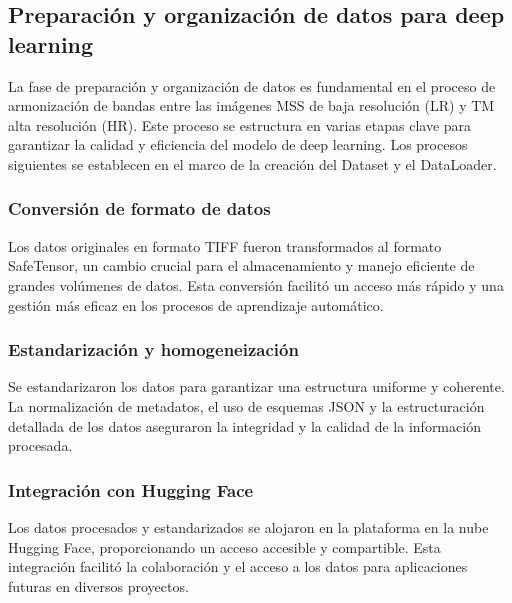

        \subsection{Preparación y organización de datos para deep learning}
            La fase de preparación y organización de datos es fundamental en el proceso de armonización de bandas entre las imágenes MSS de baja resolución (LR) y TM alta resolución (HR). Este proceso se estructura en varias etapas clave para garantizar la calidad y eficiencia del modelo de deep learning. Los procesos siguientes se establecen en el marco de la creación del Dataset y el DataLoader.

            \subsubsection{Conversión de formato de datos}
                Los datos originales en formato TIFF fueron transformados al formato SafeTensor, un cambio crucial para el almacenamiento y manejo eficiente de grandes volúmenes de datos. Esta conversión facilitó un acceso más rápido y una gestión más eficaz en los procesos de aprendizaje automático.

            \subsubsection{Estandarización y homogeneización}
                Se estandarizaron los datos para garantizar una estructura uniforme y coherente. La normalización de metadatos, el uso de esquemas JSON y la estructuración detallada de los datos aseguraron la integridad y la calidad de la información procesada.

            \subsubsection{Integración con Hugging Face}
                Los datos procesados y estandarizados se alojaron en la plataforma en la nube Hugging Face, proporcionando un acceso accesible y compartible. Esta integración facilitó la colaboración y el acceso a los datos para aplicaciones futuras en diversos proyectos.
            


